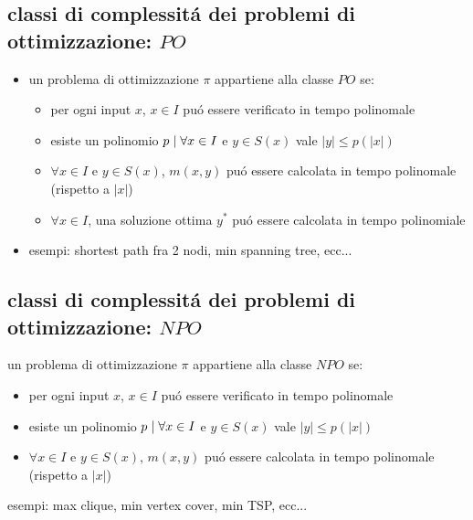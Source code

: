 
\subsection*{classi di complessit\'a dei problemi di ottimizzazione: $PO$}
\begin{flushleft}
	\begin{itemize}
		\item un problema di ottimizzazione $\pi$ appartiene alla classe $PO$ se:
		\begin{itemize}
			\item per ogni input $x$, $x\in I$ pu\'o essere verificato in tempo polinomale
			\item esiste un polinomio $p\hspace{0.1cm}\vert\hspace{0.1cm}\forall x\in I$ e $y\in S(x)$ vale $|y|\leq p(|x|)$ 
			\item $\forall x\in I$ e $y\in S(x)$, $m(x,y)$ pu\'o essere calcolata in tempo polinomale (rispetto a $|x|$) 
			\item $\forall x\in I$, una soluzione ottima $y^*$ pu\'o essere calcolata in tempo polinomiale
		\end{itemize}
		\item esempi: shortest path fra 2 nodi, min spanning tree, ecc...
	\end{itemize}
\end{flushleft}


\subsection*{classi di complessit\'a dei problemi di ottimizzazione: $NPO$}
\begin{flushleft}
		\item un problema di ottimizzazione $\pi$ appartiene alla classe $NPO$ se:
		\begin{itemize}
			\item per ogni input $x$, $x\in I$ pu\'o essere verificato in tempo polinomale
			\item esiste un polinomio $p\hspace{0.1cm}\vert\hspace{0.1cm}\forall x\in I$ e $y\in S(x)$ vale $|y|\leq p(|x|)$ 
			\item $\forall x\in I$ e $y\in S(x)$, $m(x,y)$ pu\'o essere calcolata in tempo polinomale (rispetto a $|x|$) 
		\end{itemize}
		\item esempi: max clique, min vertex cover, min TSP, ecc...
\end{flushleft}

